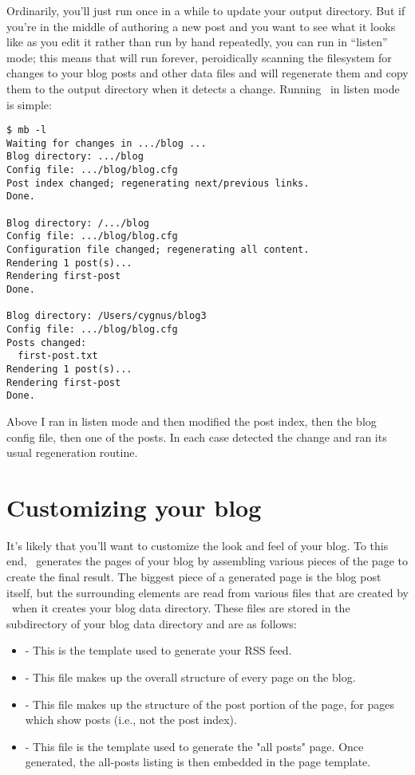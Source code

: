 \documentclass[11pt, letterpaper, oneside, titlepage]{book}
\begin{document}
Ordinarily, you'll just run  once in a while to update your
output directory.  But if you're in the middle of authoring a new post
and you want to see what it looks like as you edit it rather than run
 by hand repeatedly, you can run  in ``listen'' mode;
this means that  will run forever, peroidically scanning the
filesystem for changes to your blog posts and other data files and
will regenerate them and copy them to the output directory when it
detects a change.  Running \mathblog\ in listen mode is simple:

\begin{verbatim}
$ mb -l
Waiting for changes in .../blog ...
Blog directory: .../blog
Config file: .../blog/blog.cfg
Post index changed; regenerating next/previous links.
Done.

Blog directory: /.../blog
Config file: .../blog/blog.cfg
Configuration file changed; regenerating all content.
Rendering 1 post(s)...
Rendering first-post
Done.

Blog directory: /Users/cygnus/blog3
Config file: .../blog/blog.cfg
Posts changed:
  first-post.txt
Rendering 1 post(s)...
Rendering first-post
Done.
\end{verbatim}

Above I ran  in listen mode and then modified the post index,
then the blog config file, then one of the posts.  In each case
 detected the change and ran its usual regeneration routine.

\section{Customizing your blog}
\label{ref:customizing}

It's likely that you'll want to customize the look and feel of your
blog.  To this end, \mathblog\ generates the pages of your blog by
assembling various pieces of the page to create the final result.  The
biggest piece of a generated page is the blog post itself, but the
surrounding elements are read from various files that are created by
\mathblog\ when it creates your blog data directory.  These files are
stored in the  subdirectory of your blog data directory
and are as follows:

\begin{itemize}
\item{ - This is the template used to
  generate your RSS feed.}
\item{ - This file makes up the
  overall structure of every page on the blog.}
\item{ - This file makes up the
  structure of the post portion of the page, for pages which show
  posts (i.e., not the post index).}
\item{ - This file is the template
  used to generate the "all posts" page.  Once generated, the
  all-posts listing is then embedded in the page template.}
\end{itemize}
\end{document}
